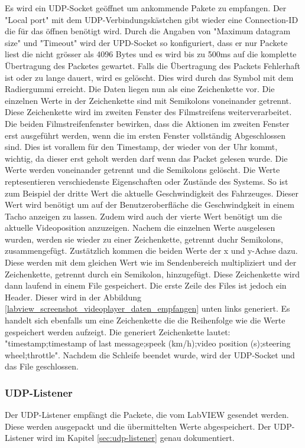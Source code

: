 Es wird ein UDP-Socket geöffnet um ankommende Pakete zu empfangen. Der "Local port" mit dem UDP-Verbindungskästchen gibt wieder eine Connection-ID die für das öffnen benötigt wird. Durch die Angaben von "Maximum datagram size" und "Timeout" wird der UPD-Socket so konfiguriert, dass er nur Packete liest die nicht grösser als 4096 Bytes und es wird bis zu 500ms auf die komplette Übertragung des Packetes gewartet. Falls die Übertragung des Packets Fehlerhaft ist oder zu lange dauert, wird es gelöscht. Dies wird durch das Symbol mit dem Radiergummi erreicht. Die Daten liegen nun als eine Zeichenkette vor. Die einzelnen Werte in der Zeichenkette sind mit Semikolons voneinander getrennt. Diese Zeichenkette wird im zweiten Fenster des Filmstreifens weiterverarbeitet. Die beiden Filmstreifenfenster bewirken, dass die Aktionen im zweiten Fenster erst ausgeführt werden, wenn die im ersten Fenster vollständig Abgeschlossen sind. Dies ist vorallem für den Timestamp, der wieder von der Uhr kommt, wichtig, da dieser erst geholt werden darf wenn das Packet gelesen wurde. Die Werte werden voneinander getrennt und die Semikolons gelöscht. Die Werte reptesentieren verschiedenste Eigenschaften oder Zustände des Systems. So ist zum Beispiel der dritte Wert die aktuelle Geschwindigkeit des Fahrzeuges. Dieser Wert wird benötigt um auf der Benutzeroberfläche die Geschwindgkeit in einem Tacho anzeigen zu lassen. Zudem wird auch der vierte Wert benötigt um die aktuelle Videoposition anzuzeigen. Nachem die einzelnen Werte ausgelesen wurden, werden sie wieder zu einer Zeichenkette, getrennt duchr Semikolons, zusammengefügt. Zustätzlich kommen die beiden Werte der x und y-Achse dazu. Diese werden mit dem gleichen Wert wie im Sendenbereich multipliziert und der Zeichenkette, getrennt durch ein Semikolon, hinzugefügt.  Diese Zeichenkette wird dann laufend in einem File gespeichert. Die erste Zeile des Files ist jedoch ein Header. Dieser wird in der Abbildung \ref{labview_screenshot_videoplayer_daten_empfangen} unten links generiert. Es handelt sich ebenfalls um eine Zeichenkette die die Reihenfolge wie die Werte gespeichert werden aufzeigt. Die generiert Zeichenkette lautet: "timestamp;timestamp of last message;speek (km/h);video position (s);steering wheel;throttle". Nachdem die Schleife beendet wurde, wird der UDP-Socket und das File geschlossen.

\subsubsection{UDP-Listener}
Der UDP-Listener empfängt die Packete, die vom LabVIEW gesendet werden. Diese werden ausgepackt und die übermittelten Werte abgespeichert. Der UDP-Listener wird im Kapitel \ref{sec:udp-listener} genau dokumentiert. 
